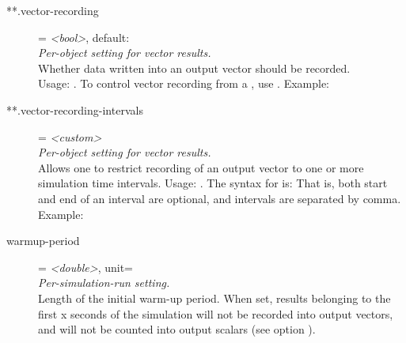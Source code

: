 \begin{description}
\item[**.vector-recording] = \textit{<bool>}, default: \\
    \textit{Per-object setting for vector results.}\\
    Whether data written into an output vector should be recorded.\\Usage:
    .
    To control vector recording from a , use
    . Example:
\item[**.vector-recording-intervals] = \textit{<custom>}\\
    \textit{Per-object setting for vector results.}\\
    Allows one to restrict recording of an output vector to one or more
    simulation time intervals. Usage:
    .
    The syntax for  is:
     That is,
    both start and end of an interval are optional, and intervals are separated
    by comma.\\Example:
\item[warmup-period] = \textit{<double>}, unit=\\
    \textit{Per-simulation-run setting.}\\
    Length of the initial warm-up period. When set, results belonging to the
    first x seconds of the simulation will not be recorded into output vectors,
    and will not be counted into output scalars (see option
    ).

\end{description}
